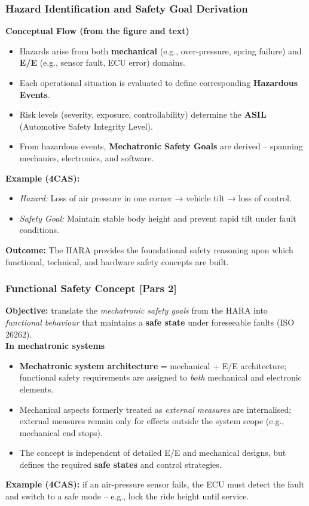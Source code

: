 \begin{frame}
	\frametitle{Hazard Identification and Safety Goal Derivation}
  \textbf{Conceptual Flow (from the figure and text)}
  \begin{itemize}
    \item Hazards arise from both \textbf{mechanical} (e.g., over-pressure, spring failure) and \textbf{E/E} (e.g., sensor fault, ECU error) domains.
    \item Each operational situation is evaluated to define corresponding \textbf{Hazardous Events}.
    \item Risk levels (severity, exposure, controllability) determine the \textbf{ASIL} (Automotive Safety Integrity Level).
    \item From hazardous events, \textbf{Mechatronic Safety Goals} are derived -- spanning mechanics, electronics, and software.
  \end{itemize}
  \textbf{Example (4CAS):}
  \begin{itemize}
    \item \emph{Hazard:} Loss of air pressure in one corner → vehicle tilt → loss of control.
    \item \emph{Safety Goal:} Maintain stable body height and prevent rapid tilt under fault conditions.
  \end{itemize}
  \textbf{Outcome:}
  The HARA provides the foundational safety reasoning upon which functional, technical, and hardware safety concepts are built.
\end{frame}
\begin{frame}
	\frametitle{Functional Safety Concept [Pars 2]}
	\textbf{Objective:} translate the \emph{mechatronic safety goals} from the HARA into \emph{functional behaviour} that maintains a \textbf{safe state} under foreseeable faults (ISO 26262).\\[2mm]
	\textbf{In mechatronic systems}
	\begin{itemize}
		\item \textbf{Mechatronic system architecture} = mechanical + E/E architecture; functional safety requirements are assigned to \emph{both} mechanical and electronic elements.
		\item Mechanical aspects formerly treated as \emph{external measures} are internalised; external measures remain only for effects outside the system scope (e.g., mechanical end stops).
		\item The concept is independent of detailed E/E and mechanical designs, but defines the required \textbf{safe states} and control strategies.
	\end{itemize}
	\textbf{Example (4CAS):} if an air-pressure sensor fails, the ECU must detect the fault and switch to a safe mode -- e.g., lock the ride height until service.
\end{frame}

